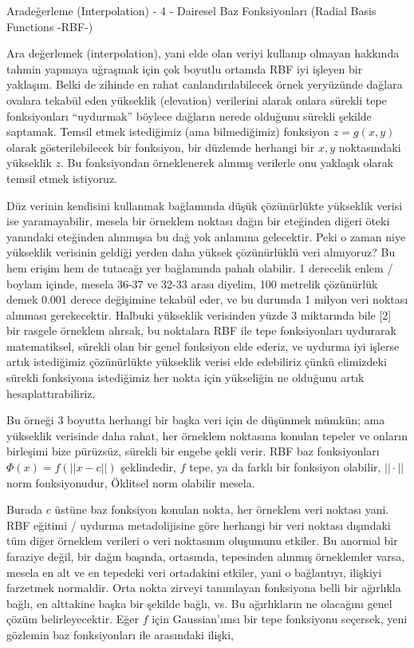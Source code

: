 \documentclass[12pt,fleqn]{article}\usepackage{../../common}
\begin{document}
Aradeğerleme (Interpolation) - 4 - Dairesel Baz Fonksiyonları (Radial Basis Functions -RBF-)

Ara değerlemek (interpolation), yani elde olan veriyi kullanıp olmayan hakkında
tahmin yapmaya uğraşmak için çok boyutlu ortamda RBF iyi işleyen bir
yaklaşım. Belki de zihinde en rahat canlandırılabilecek örnek yeryüzünde dağlara
ovalara tekabül eden yükseklik (elevation) verilerini alarak onlara sürekli tepe
fonksiyonları ``uydurmak'' böylece dağların nerede olduğunu sürekli şekilde
saptamak. Temsil etmek istediğimiz (ama bilmediğimiz) fonksiyon $z=g(x,y)$
olarak gösterilebilecek bir fonksiyon, bir düzlemde herhangi bir $x,y$
noktasındaki yükseklik $z$. Bu fonksiyondan örneklenerek alınmış verilerle onu
yaklaşık olarak temsil etmek istiyoruz.

Düz verinin kendisini kullanmak bağlamında düşük çözünürlükte yükseklik verisi
ise yaramayabilir, mesela bir örneklem noktası dağın bir eteğinden diğeri öteki
yanındaki eteğinden alınmışsa bu dağ yok anlamına gelecektir. Peki o zaman niye
yükseklik verisinin geldiği yerden daha yüksek çözünürlüklü veri almıyoruz?  Bu
hem erişim hem de tutacağı yer bağlamında pahalı olabilir. 1 derecelik enlem /
boylam içinde, mesela 36-37 ve 32-33 arası diyelim, 100 metrelik çözünürlük
demek 0.001 derece değişimine tekabül eder, ve bu durumda 1 milyon veri noktası
alınması gerekecektir. Halbuki yükseklik verisinden yüzde 3 miktarında bile [2]
bir rasgele örneklem alırsak, bu noktalara RBF ile tepe fonksiyonları uydurarak
matematiksel, sürekli olan bir genel fonksiyon elde ederiz, ve uydurma iyi
işlerse artık istediğimiz çözünürlükte yükseklik verisi elde edebiliriz çünkü
elimizdeki sürekli fonksiyona istediğimiz her nokta için yükseliğin ne olduğunu
artık hesaplattırabiliriz.

Bu örneği 3 boyutta herhangi bir başka veri için de düşünmek mümkün; ama
yükseklik verisinde daha rahat, her örneklem noktasına konulan tepeler ve
onların birleşimi bize pürüzsüz, sürekli bir engebe şekli verir. RBF baz
fonksiyonları $\Phi(x) = f(||x-c||)$ şeklindedir, $f$ tepe, ya da farklı bir
fonksiyon olabilir, $||\cdot||$ norm fonksiyonudur, Öklitsel norm olabilir
mesela.

Burada $c$ üstüne baz fonksiyon konulan nokta, her örneklem veri noktası
yani. RBF eğitimi / uydurma metadolijisine göre herhangi bir veri noktası
dışındaki tüm diğer örneklem verileri o veri noktasının oluşumunu etkiler. Bu
anormal bir faraziye değil, bir dağın başında, ortasında, tepesinden alınmış
örneklemler varsa, mesela en alt ve en tepedeki veri ortadakini etkiler, yani o
bağlantıyı, ilişkiyi farzetmek normaldir. Orta nokta zirveyi tanımlayan
fonksiyona belli bir ağırlıkla bağlı, en alttakine başka bir şekilde bağlı,
vs. Bu ağırlıkların ne olacağını genel çözüm belirleyecektir. Eğer $f$ için
Gaussian'ımsı bir tepe fonksiyonu seçersek, yeni gözlemin baz fonksiyonları ile
arasındaki ilişki,
\end{document}
